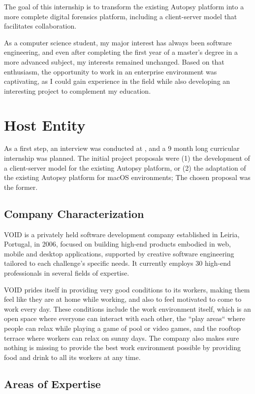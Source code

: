 The goal of this internship is to transform the existing Autopsy platform into a more complete digital forensics platform, including a client-server model that facilitates collaboration.

As a computer science student, my major interest has always been software engineering, and even after completing the first year of a master's degree in a more advanced subject, 
my interests remained unchanged. Based on that enthusiasm, the opportunity to work in an enterprise environment was captivating, as I could gain experience in the 
field while also developing an interesting project to complement my education.

\section{Host Entity}

As a first step, an interview was conducted at \company \cite{void}, and a 9 month long curricular internship was planned. The initial project proposals were (1) the development of a 
client-server model for the existing Autopsy platform, or (2) the adaptation of the existing Autopsy platform for macOS \cite{macos} environments; The chosen proposal was the former.

\subsection{Company Characterization}

VOID is a privately held software development company established in Leiria, Portugal, in 2006, focused on building high-end products embodied in web, 
mobile and desktop applications, supported by creative software engineering tailored to each challenge's specific needs. 
It currently employs 30 high-end professionals in several fields of expertise.

VOID prides itself in providing very good conditions to its workers, making them feel like they are at home while working,
and also to feel motivated to come to work every day. These conditions include the work environment itself, which is an open space where 
everyone can interact with each other, the ``play areas`` where people can relax while playing a game of pool or video games, and the rooftop terrace where workers can relax on sunny days.
The company also makes sure nothing is missing to provide the best work environment possible by providing food and drink to all its workers at any time.

\subsection{Areas of Expertise}

